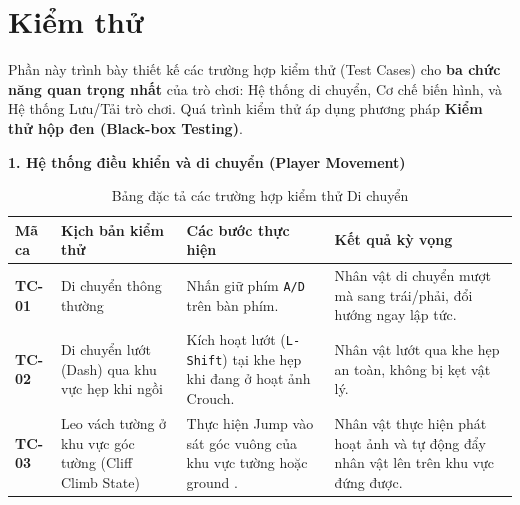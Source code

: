\documentclass[../DoAn.tex]{subfiles}
\begin{document}
\section{Kiểm thử}
\label{section:5.6}
Phần này trình bày thiết kế các trường hợp kiểm thử (Test Cases) cho \textbf{ba chức năng quan trọng nhất} của trò chơi: Hệ thống di chuyển, Cơ chế biến hình, và Hệ thống Lưu/Tải trò chơi. Quá trình kiểm thử áp dụng phương pháp \textbf{Kiểm thử hộp đen (Black-box Testing)}.

\vspace{10pt}
\textbf{1. Hệ thống điều khiển và di chuyển (Player Movement)}
\begin{table}[H]
\centering
\begin{tabular}{|p{1.2cm}|p{3.8cm}|p{3.8cm}|p{4.3cm}|}
\hline
\textbf{Mã ca} & \textbf{Kịch bản kiểm thử} & \textbf{Các bước thực hiện} & \textbf{Kết quả kỳ vọng} \\ \hline
\textbf{TC-01} & Di chuyển thông thường & Nhấn giữ phím \texttt{A/D} trên bàn phím. & Nhân vật di chuyển mượt mà sang trái/phải, đổi hướng ngay lập tức. \\ \hline
\textbf{TC-02} & Di chuyển lướt (Dash) qua khu vực hẹp khi ngồi & Kích hoạt lướt (\texttt{L-Shift}) tại khe hẹp khi đang ở hoạt ảnh Crouch. & Nhân vật lướt qua khe hẹp an toàn, không bị kẹt vật lý. \\ \hline
\textbf{TC-03} & Leo vách tường ở khu vực góc tường (Cliff Climb State)& Thực hiện Jump vào sát góc vuông của khu vực tường hoặc ground . & Nhân vật thực hiện phát hoạt ảnh và tự động đẩy nhân vật lên trên khu vực đứng được. \\ \hline
\end{tabular}
\caption{Bảng đặc tả các trường hợp kiểm thử Di chuyển}
\label{table:test_movement}
\end{table}
\end{document}
